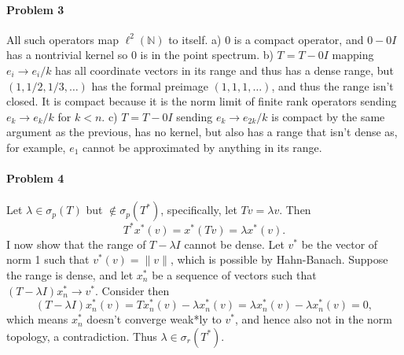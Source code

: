 \documentclass[12pt]{article}
\newcommand{\s}{\sigma}
\renewcommand{\l}{\lambda}
\begin{document}
\paragraph{Problem 3}
All such operators map $\ell^2(\mathbb{N})$ to itself.
a) 0 is a compact operator, and $0 - 0I$ has a nontrivial kernel so 0 is in the
point spectrum. b) $T = T - 0I$ 
 mapping $e_i \to e_i/k$ has all coordinate vectors in its
range and thus has a dense range, but $(1,1/2,1/3,\ldots)$ has the formal
preimage $(1,1,1,\ldots)$, and thus the range isn't closed. It is compact
because it is the norm limit of finite rank operators sending $e_k\to e_k/k$
for $k < n$. c) $T = T- 0I$ sending $e_k \to e_{2k}/k$ is compact by the same
argument as the previous, has no kernel, but also has a range that isn't dense
as, for example, $e_1$ cannot be approximated by anything in its range.

\paragraph{Problem 4}
Let $\l \in \s_p(T)$ but $\notin \s_p(T^*)$, specifically, let $Tv = \l v$. Then
\begin{displaymath}
  T^*x^*(v) = x^*(Tv) = \lambda x^*(v).
\end{displaymath}
I now show that the range of $T-\l I$ cannot be dense. Let $v^*$ be the vector
of norm 1 such that $v^*(v) = \|v\|$, which is possible by Hahn-Banach. Suppose
the range is dense, and let $x_n^*$ be a sequence of vectors such that
$(T-\l I)x_n^*\to v^*$. Consider then
\begin{displaymath}
  (T-\l I)x_n^*(v) = Tx_n^*(v)-\l x_n^*(v) = \l x_n^*(v)-\l x_n^*(v) = 0,
\end{displaymath}
which means $x^*_n$ doesn't converge weak*ly to $v^*$, and hence also not in the
norm topology, a contradiction. Thus $\l \in \s_r(T^*)$.
\end{document}
